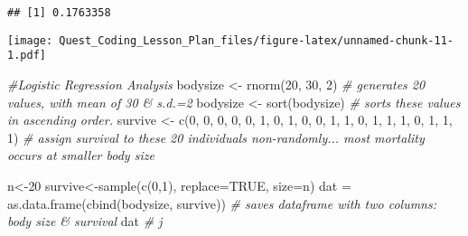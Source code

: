 \documentclass[
]{article}
\newenvironment{Shaded}{\begin{snugshade}}{\end{snugshade}}
\newcommand{\AttributeTok}[1]{\textcolor[rgb]{0.77,0.63,0.00}{#1}}
\newcommand{\CommentTok}[1]{\textcolor[rgb]{0.56,0.35,0.01}{\textit{#1}}}
\newcommand{\ConstantTok}[1]{\textcolor[rgb]{0.00,0.00,0.00}{#1}}
\newcommand{\DecValTok}[1]{\textcolor[rgb]{0.00,0.00,0.81}{#1}}
\newcommand{\FloatTok}[1]{\textcolor[rgb]{0.00,0.00,0.81}{#1}}
\newcommand{\FunctionTok}[1]{\textcolor[rgb]{0.00,0.00,0.00}{#1}}
\newcommand{\NormalTok}[1]{#1}
\newcommand{\OtherTok}[1]{\textcolor[rgb]{0.56,0.35,0.01}{#1}}
\newcommand{\SpecialCharTok}[1]{\textcolor[rgb]{0.00,0.00,0.00}{#1}}
\newcommand{\StringTok}[1]{\textcolor[rgb]{0.31,0.60,0.02}{#1}}
\begin{document}
\begin{verbatim}
## [1] 0.1763358
\end{verbatim}

\begin{Shaded}
\end{Shaded}

\texttt{[image: Quest\_Coding\_Lesson\_Plan\_files/figure-latex/unnamed-chunk-11-1.pdf]}

\begin{Shaded}
\begin{Highlighting}[]
\CommentTok{\#Logistic Regression Analysis}
\NormalTok{bodysize }\OtherTok{\textless{}{-}} \FunctionTok{rnorm}\NormalTok{(}\DecValTok{20}\NormalTok{, }\DecValTok{30}\NormalTok{, }\DecValTok{2}\NormalTok{) }\CommentTok{\# generates 20 values, with mean of 30 \& s.d.=2}
\NormalTok{bodysize }\OtherTok{\textless{}{-}} \FunctionTok{sort}\NormalTok{(bodysize) }\CommentTok{\# sorts these values in ascending order.}
\NormalTok{survive }\OtherTok{\textless{}{-}} \FunctionTok{c}\NormalTok{(}\DecValTok{0}\NormalTok{, }\DecValTok{0}\NormalTok{, }\DecValTok{0}\NormalTok{, }\DecValTok{0}\NormalTok{, }\DecValTok{0}\NormalTok{, }\DecValTok{1}\NormalTok{, }\DecValTok{0}\NormalTok{, }\DecValTok{1}\NormalTok{, }\DecValTok{0}\NormalTok{, }\DecValTok{0}\NormalTok{, }\DecValTok{1}\NormalTok{, }\DecValTok{1}\NormalTok{, }\DecValTok{0}\NormalTok{, }\DecValTok{1}\NormalTok{, }\DecValTok{1}\NormalTok{, }\DecValTok{1}\NormalTok{, }\DecValTok{0}\NormalTok{, }\DecValTok{1}\NormalTok{, }\DecValTok{1}\NormalTok{, }\DecValTok{1}\NormalTok{) }\CommentTok{\# assign \textquotesingle{}survival\textquotesingle{} to these 20 individuals non{-}randomly... most mortality occurs at smaller body size}

\NormalTok{n}\OtherTok{\textless{}{-}}\DecValTok{20}
\NormalTok{survive}\OtherTok{\textless{}{-}}\FunctionTok{sample}\NormalTok{(}\FunctionTok{c}\NormalTok{(}\DecValTok{0}\NormalTok{,}\DecValTok{1}\NormalTok{), }\AttributeTok{replace=}\ConstantTok{TRUE}\NormalTok{, }\AttributeTok{size=}\NormalTok{n)}
\NormalTok{dat }\OtherTok{=} \FunctionTok{as.data.frame}\NormalTok{(}\FunctionTok{cbind}\NormalTok{(bodysize, survive)) }\CommentTok{\# saves dataframe with two columns: body size \& survival}
\NormalTok{dat }\CommentTok{\# j}
\end{Highlighting}
\end{Shaded}
\end{document}
